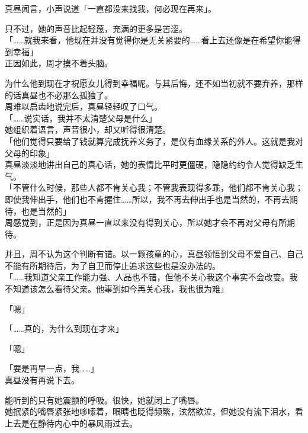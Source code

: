 真昼闻言，小声说道「一直都没来找我，何必现在再来」。

只不过，她的声音比起轻蔑，充满的更多是苦涩。\\

「……就我来看，他现在并没有觉得你是无关紧要的……看上去还像是在希望你能得到幸福」\\

正因如此，周才摸不着头脑。

为什么他到现在才祝愿女儿得到幸福呢。与其后悔，还不如当初就不要弃养，那样的话真昼也不必那么孤独了。\\

周难以启齿地说完后，真昼轻轻叹了口气。\\

「……说实话，我并不太清楚父母是什么」\\

她组织着语言，声音很小，却又听得很清楚。\\

「他们觉得只要给了钱就算完成抚养义务了，是仅有血缘关系的外人。这就是我对父母的印象」\\

真昼淡淡地讲出自己的真心话，她的表情比平时更僵硬，隐隐约约令人觉得缺乏生气。\\

「不管什么时候，那些人都不肯关心我；不管我表现得多乖，他们都不肯关心我；即使我伸出手，他们也不肯握住……所以，我不再去伸出手也是当然的，不再去期待，也是当然的」\\

周感觉到，正是因为真昼一直以来没有得到关心，所以她才会不再对父母有所期待。

并且，周不认为这个判断有错。以一颗孩童的心，真昼领悟到父母不爱自己、自己不能有所期待后，为了自卫而停止追求这些也是没办法的。\\

「……我知道父亲工作能力强、人品也不错，但他不关心我这个事实不会改变。我不知道该怎么看待父亲。他事到如今再关心我，我也很为难」

「嗯」

「……真的，为什么到现在才来」

「嗯」

「要是再早一点，我……」\\

真昼没有再说下去。

能听到的只有她震颤的呼吸。很快，她就闭上了嘴唇。\\

她抿紧的嘴唇紧张地哆嗦着，眼睛也眨得频繁，泫然欲泣，但她没有流下泪水，看上去是在静待内心中的暴风雨过去。\\

